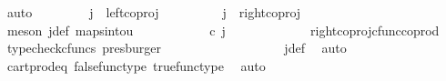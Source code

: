 \begin{isabellebody}
\ auto\isanewline
\ \ \isamarkupfalse%
\isanewline
\ \ \ \ \isamarkupfalse%
\ {\isachardoublequoteopen}j\ {\isasymnoteq}\ left{\isacharunderscore}{\kern0pt}coproj\ {\isasymone}\ {\isasymone}{\isachardoublequoteclose}\isanewline
\ \ \ \ \isamarkupfalse%
\ \isamarkupfalse%
\ {\isachardoublequoteopen}j\ {\isacharequal}{\kern0pt}\ right{\isacharunderscore}{\kern0pt}coproj\ {\isasymone}\ {\isasymone}{\isachardoublequoteclose}\isanewline
\ \ \ \ \ \ \isamarkupfalse%
\ {\isacharparenleft}{\kern0pt}meson\ j{\isacharunderscore}{\kern0pt}def\ maps{\isacharunderscore}{\kern0pt}into{\isacharunderscore}{\kern0pt}{}u{}{\isacharparenright}{\kern0pt}\isanewline
\ \ \ \ \isamarkupfalse%
\ \isamarkupfalse%
\ {\isachardoublequoteopen}{\isacharparenleft}{\kern0pt}{\isasymlangle}{\isasymt}{\isacharcomma}{\kern0pt}\ {\isasymf}{\isasymrangle}\ {\isasymamalg}{\isasymlangle}{\isasymf}{\isacharcomma}{\kern0pt}\ {\isasymt}{\isasymrangle}{\isacharparenright}{\kern0pt}\ {\isasymcirc}\isactrlsub c\ j\ \ {\isacharequal}{\kern0pt}\ {\isasymlangle}{\isasymf}{\isacharcomma}{\kern0pt}\ {\isasymt}{\isasymrangle}{\isachardoublequoteclose}\isanewline
\ \ \ \ \ \ \isamarkupfalse%
\ \ right{\isacharunderscore}{\kern0pt}coproj{\isacharunderscore}{\kern0pt}cfunc{\isacharunderscore}{\kern0pt}coprod\ \isamarkupfalse%
\ {\isacharparenleft}{\kern0pt}typecheck{\isacharunderscore}{\kern0pt}cfuncs{\isacharcomma}{\kern0pt}\ presburger{\isacharparenright}{\kern0pt}\isanewline
\ \ \ \ \isamarkupfalse%
\ \isamarkupfalse%
\ {\isachardoublequoteopen}{\isasymlangle}{\isasymf}{\isacharcomma}{\kern0pt}\ {\isasymt}{\isasymrangle}\ {\isacharequal}{\kern0pt}\ {\isasymlangle}{\isasymf}{\isacharcomma}{\kern0pt}{\isasymf}{\isasymrangle}{\isachardoublequoteclose}\isanewline
\ \ \ \ \ \ \isamarkupfalse%
\ j{\isacharunderscore}{\kern0pt}def\ \isamarkupfalse%
\ auto\isanewline
\ \ \ \ \isamarkupfalse%
\ \isamarkupfalse%
\ {\isachardoublequoteopen}{\isasymt}\ {\isacharequal}{\kern0pt}\ {\isasymf}{\isachardoublequoteclose}\isanewline
\ \ \ \ \ \ \isamarkupfalse%
\ cart{\isacharunderscore}{\kern0pt}prod{\isacharunderscore}{\kern0pt}eq{}\ false{\isacharunderscore}{\kern0pt}func{\isacharunderscore}{\kern0pt}type\ true{\isacharunderscore}{\kern0pt}func{\isacharunderscore}{\kern0pt}type\ \isamarkupfalse%
\ auto\isanewline

\end{isabellebody}
